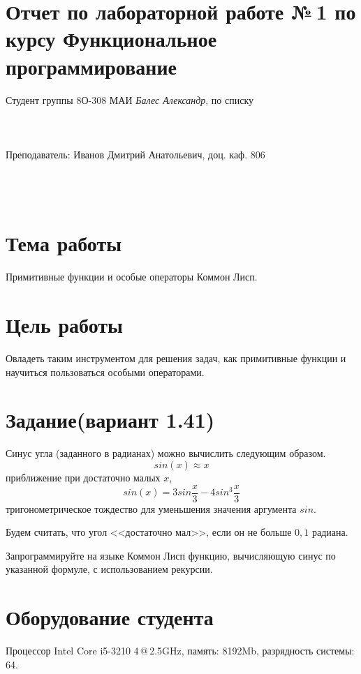 \documentclass[12pt]{article}
\begin{document}
\section*{Отчет по лабораторной работе №\,1 
по курсу \guillemotleft  Функциональное программирование\guillemotright}
\begin{flushright}
Студент группы 8О-308 МАИ \textit{Балес Александр},  по списку \\
 \\
 \\
\ \\
Преподаватель: Иванов Дмитрий Анатольевич, доц. каф. 806 \\
 \\
 \\
 \\

\end{flushright}

\section{Тема работы}
Примитивные функции и особые операторы Коммон Лисп.

\section{Цель работы}
Овладеть таким инструментом для решения задач, как примитивные функции и научиться пользоваться особыми операторами.

\section{Задание(вариант 1.41)}
Синус угла (заданного в радианах) можно вычислить следующим образом.
$$sin(x)\approx x$$ приближение при достаточно малых $x$, $$sin(x) = 3sin\dfrac{x}{3} - 4sin^3\dfrac{x}{3}$$ тригонометрическое тождество для уменьшения значения аргумента $sin$.

Будем считать, что угол <<достаточно мал>>, если он не больше $0,1$ радиана.

Запрограммируйте на языке Коммон Лисп функцию, вычисляющую синус по указанной формуле, с использованием рекурсии.
\section{Оборудование студента}
Процессор Intel Core i5-3210 4\,@\,2.5GHz, память: 8192Mb, разрядность системы: 64.
\end{document}
